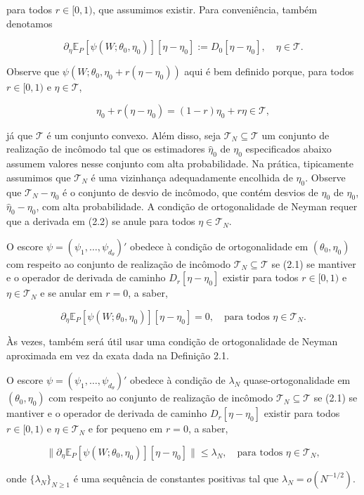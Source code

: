 \documentclass[a4paper,12pt]{article}[abntex2]
\begin{document}
para todos $r \in [0, 1)$, que assumimos existir. Para conveniência, também denotamos

\[
\partial_\eta \mathbb{E}_P[\psi(W; \theta_0, \eta_0)][\eta - \eta_0] := D_0[\eta - \eta_0], \quad \eta \in \mathcal{T}.
\]

Observe que $\psi(W; \theta_0, \eta_0 + r(\eta - \eta_0))$ aqui é bem definido porque, para todos $r \in [0, 1)$ e $\eta \in \mathcal{T}$,

\[
\eta_0 + r(\eta - \eta_0) = (1 - r)\eta_0 + r\eta \in \mathcal{T},
\]

já que $\mathcal{T}$ é um conjunto convexo. Além disso, seja $\mathcal{T}_N \subseteq \mathcal{T}$ um conjunto de realização de incômodo tal que os estimadores $\hat{\eta}_0$ de $\eta_0$ especificados abaixo assumem valores nesse conjunto com alta probabilidade. Na prática, tipicamente assumimos que $\mathcal{T}_N$ é uma vizinhança adequadamente encolhida de $\eta_0$. Observe que $\mathcal{T}_N - \eta_0$ é o conjunto de desvio de incômodo, que contém desvios de $\hat{\eta}_0$ de $\eta_0$, $\hat{\eta}_0 - \eta_0$, com alta probabilidade. A condição de ortogonalidade de Neyman requer que a derivada em (2.2) se anule para todos $\eta \in \mathcal{T}_N$.

\begin{definition}
O escore $\psi = (\psi_1, \ldots, \psi_{d_\theta})'$ obedece à condição de ortogonalidade em $(\theta_0, \eta_0)$ com respeito ao conjunto de realização de incômodo $\mathcal{T}_N \subseteq \mathcal{T}$ se (2.1) se mantiver e o operador de derivada de caminho $D_r[\eta - \eta_0]$ existir para todos $r \in [0, 1)$ e $\eta \in \mathcal{T}_N$ e se anular em $r = 0$, a saber,

\[
\partial_\eta \mathbb{E}_P[\psi(W; \theta_0, \eta_0)][\eta - \eta_0] = 0, \quad \text{para todos } \eta \in \mathcal{T}_N.
\]
\end{definition}

Às vezes, também será útil usar uma condição de ortogonalidade de Neyman aproximada em vez da exata dada na Definição 2.1.

\begin{definition}
O escore $\psi = (\psi_1, \ldots, \psi_{d_\theta})'$ obedece à condição de $\lambda_N$ quase-ortogonalidade em $(\theta_0, \eta_0)$ com respeito ao conjunto de realização de incômodo $\mathcal{T}_N \subseteq \mathcal{T}$ se (2.1) se mantiver e o operador de derivada de caminho $D_r[\eta - \eta_0]$ existir para todos $r \in [0, 1)$ e $\eta \in \mathcal{T}_N$ e for pequeno em $r = 0$, a saber,

\[
\|\partial_\eta \mathbb{E}_P[\psi(W; \theta_0, \eta_0)][\eta - \eta_0]\| \leq \lambda_N, \quad \text{para todos } \eta \in \mathcal{T}_N,
\]

onde $\{\lambda_N\}_{N \geq 1}$ é uma sequência de constantes positivas tal que $\lambda_N = o(N^{-1/2})$.
\end{definition}
\end{document}
